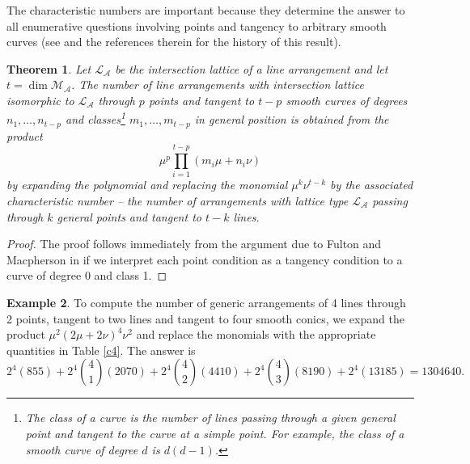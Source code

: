 \documentclass[12pt]{article}
\theoremstyle{plain}
\newtheorem{theorem}{Theorem}
\theoremstyle{definition}
\newtheorem{example}[theorem]{Example}
\newcommand{\A}{\mathcal{A}}
\newcommand{\M}{\mathcal{M}}
\renewcommand{\L}{\mathcal{L}}
\newcommand{\MLA}{\M_{\A}}
\begin{document}
The characteristic numbers are important because they determine the
answer to all enumerative questions involving points and tangency to
arbitrary smooth curves (see \cite[section 10.4]{Fulton} and the
references therein for the history of this result). 

\begin{theorem} \label{FKMt}
Let $\L_\A$ be the intersection lattice of a line arrangement and let
$t = \dim \MLA$. The number of line arrangements with intersection
lattice isomorphic to $\L_\A$ through $p$ points and tangent to $t-p$
smooth curves of degrees $n_1, \ldots, n_{t-p}$ and classes\footnote{The class of a curve is the number of lines passing
through a given general point and tangent to the curve at a simple
point. For example, the class of a smooth curve of degree $d$ is $d(d-1)$.} $m_1,
\ldots, m_{t-p}$ in general position is obtained from the
product $$ \mu^p \prod_{i=1}^{t-p}  (m_i \mu + n_i\nu) $$ by expanding the
polynomial and replacing the monomial $\mu^k \nu^{t-k}$ by the
associated characteristic number -- the number
of arrangements with lattice type $\L_\A$ passing through $k$ general
points and tangent to $t-k$ lines.    
\end{theorem}

\begin{proof}
The proof follows immediately from the argument due to Fulton
and Macpherson in \cite[section 10.4]{Fulton} if we interpret each
point condition as a tangency condition to a curve of degree 0 and
class 1.
\end{proof}

\begin{example}
To compute the number of generic arrangements of 4 lines through 2
points, tangent to two lines and tangent to four smooth conics, we
expand the product $\mu^2(2\mu + 2\nu)^4\nu^2$ and replace the
monomials with the appropriate quantities in Table \ref{c4}. The
answer
is $$2^4(855)+2^4\binom{4}{1}(2070)+2^4\binom{4}{2}(4410)+2^4\binom{4}{3}(8190)+
2^4(13185) = 1304640. $$
\end{example}
\end{document}

